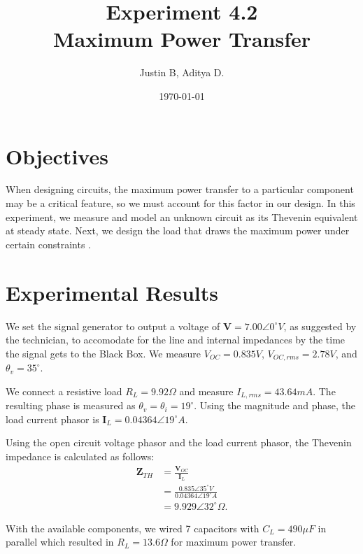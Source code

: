 \documentclass[12pt]{article}
\begin{document}
\title{Experiment 4.2\\Maximum Power Transfer}
\author{Justin B, Aditya D.}
\date{\today}
\maketitle
\pagebreak

\tableofcontents
\pagebreak
{}

\section{Objectives}
When designing circuits, the maximum power transfer to a particular component may be a critical feature, so we must account for this factor in our design.
In this experiment, we measure and model an unknown circuit as its Thevenin equivalent at steady state.
Next, we design the load that draws the maximum power under certain constraints \cite{labManual}.

\section{Experimental Results}
We set the signal generator to output a voltage of \(\bm{V} = 7.00\angle 0^\circ V\), as suggested by the technician, to accomodate for the line and internal impedances by the time the signal gets to the Black Box.
We measure \(V_{OC} = 0.835 V\), \(V_{OC, rms} = 2.78 V\), and \(\theta_v = 35^\circ\).

We connect a resistive load \(R_L = 9.92\Omega\) and measure \(I_{L, rms} = 43.64mA\).
The resulting phase is measured as \(\theta_v = \theta_i = 19^\circ\).
Using the magnitude and phase, the load current phasor is \(\bm{I}_L = 0.04364\angle 19^\circ A\).

Using the open circuit voltage phasor and the load current phasor, the Thevenin impedance is calculated as follows:
\begin{align*}
    \bm{Z}_{TH} &= \frac{\bm{V}_{OC}}{\bm{I}_L} \\
                &= \frac{0.835\angle 35^\circ V}{0.04364\angle 19^\circ A} \\
                &= 9.929\angle 32^\circ \Omega.
\end{align*}

With the available components, we wired 7 capacitors with \(C_L = 490\mu F\) in parallel which resulted in \(R_L = 13.6\Omega\) for maximum power transfer.
\newpage
\end{document}
